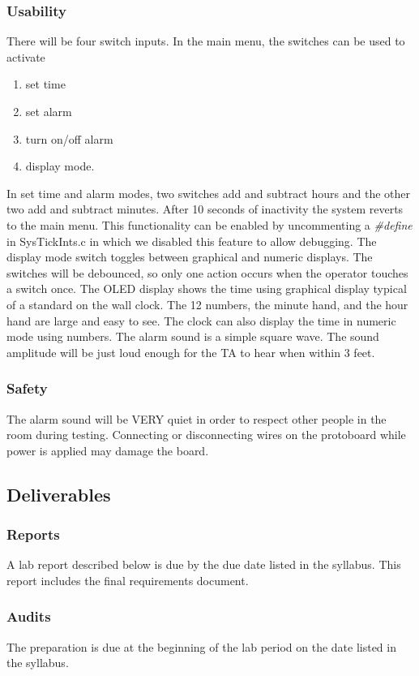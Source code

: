 \documentclass[twoside]{article}
\begin{document}
\subsubsection{Usability} 
There will be four switch inputs. In the main menu, the switches can be used to activate 
\begin{enumerate}
\item set time 
\item set alarm
\item turn on/off alarm
\item display mode.
\end{enumerate}
In set time and alarm modes, two switches add and subtract hours and the other two add and subtract minutes. After 10 seconds of inactivity the system reverts to the main menu. This functionality can be enabled by uncommenting a \emph{\#define} in SysTickInts.c in which we disabled this feature to allow debugging. The
display mode switch toggles between graphical and numeric displays. The switches will be debounced, so only one action occurs when the operator touches a switch once. The OLED display shows the time using graphical display typical of a standard on the wall clock. The 12
numbers, the minute hand, and the hour hand are large and easy to see. The clock can also display the time in numeric mode using numbers. The alarm sound is a simple square wave. The sound amplitude will be just loud enough for the TA to hear when within 3 feet.
\subsubsection{Safety} 
The alarm sound will be VERY quiet in order to respect
other people in the room during testing. Connecting or
disconnecting wires on the protoboard while power is applied may damage the board.
\subsection{Deliverables}
\subsubsection{Reports} 
A lab report described below is due by the due date listed in the syllabus. This report includes the final requirements document.
\subsubsection{Audits} 
The preparation is due at the beginning of the lab period on the date listed in the syllabus.
\end{document}
